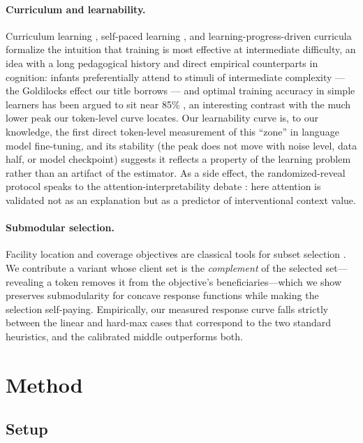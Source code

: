\documentclass{article} %
\begin{document}
\paragraph{Curriculum and learnability.} Curriculum learning \citep{bengio2009curriculum}, self-paced learning \citep{kumar2010self}, and learning-progress-driven curricula \citep{graves2017automated} formalize the intuition that training is most effective at intermediate difficulty, an idea with a long pedagogical history \citep{vygotsky1978mind} and direct empirical counterparts in cognition: infants preferentially attend to stimuli of intermediate complexity \citep{kidd2012goldilocks} --- the Goldilocks effect our title borrows --- and optimal training accuracy in simple learners has been argued to sit near 85\% \citep{wilson2019eighty}, an interesting contrast with the much lower peak our token-level curve locates. Our learnability curve is, to our knowledge, the first direct token-level measurement of this ``zone'' in language model fine-tuning, and its stability (the peak does not move with noise level, data half, or model checkpoint) suggests it reflects a property of the learning problem rather than an artifact of the estimator. As a side effect, the randomized-reveal protocol speaks to the attention-interpretability debate \citep{jain2019attention}: here attention is validated not as an explanation but as a predictor of interventional context value.

\paragraph{Submodular selection.} Facility location and coverage objectives are classical tools for subset selection \citep{nemhauser1978analysis,krause2014submodular}. We contribute a variant whose client set is the \emph{complement} of the selected set---revealing a token removes it from the objective's beneficiaries---which we show preserves submodularity for concave response functions while making the selection self-paying. Empirically, our measured response curve falls strictly between the linear and hard-max cases that correspond to the two standard heuristics, and the calibrated middle outperforms both.

\section{Method}

\subsection{Setup}
\end{document}
